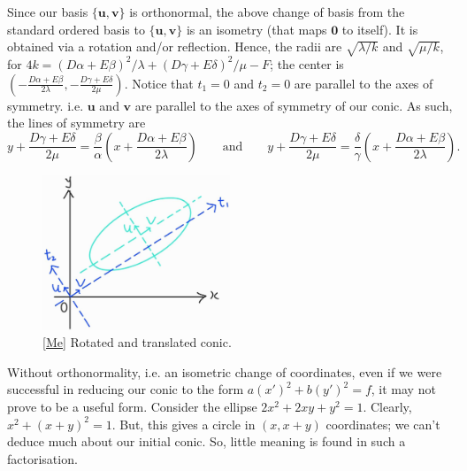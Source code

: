Since our basis \(\{\mathbf{u},\mathbf{v}\}\) is orthonormal, the above change of basis from the standard ordered basis to \(\{\mathbf{u},\mathbf{v}\}\) is an isometry (that maps \(\mathbf{0}\) to itself). It is obtained via a rotation and/or reflection. Hence, the radii are \(\sqrt{\lambda/k}\) and \(\sqrt{\mu/k}\), for \(4k=(D\alpha+E\beta)^2/\lambda+(D\gamma+E\delta)^2/\mu-F\); the center is \(\left(-\frac{D\alpha+E\beta}{2\lambda},-\frac{D\gamma+E\delta}{2\mu} \right)\). Notice that \(t_1=0\) and \(t_2=0\) are parallel to the axes of symmetry. i.e. \(\mathbf{u}\) and \(\mathbf{v}\) are parallel to the axes of symmetry of our conic. As such, the lines of symmetry are 
\[y+\frac{D\gamma+E\delta}{2\mu}=\frac{\beta}{\alpha}\left( x+\frac{D\alpha+E\beta}{2\lambda} \right) \qquad\text{and}\qquad y+\frac{D\gamma+E\delta}{2\mu}=\frac{\delta}{\gamma}\left( x+\frac{D\alpha+E\beta}{2\lambda} \right).\]
\begin{figure}[htbp]
    \centering
    \includegraphics[width=0.5\textwidth]{../Diagrams/rotated-conics.jpg}
    \caption{\ref{Me} Rotated and translated conic.}
    \label{fig:rotated-conic}
\end{figure}
\begin{note}
    Without orthonormality, i.e. an isometric change of coordinates, even if we were successful in reducing our conic to the form \(a(x')^2+b(y')^2=f\), it may not prove to be a useful form. Consider the ellipse \(2x^2+2xy+y^2=1\). Clearly, \(x^2+(x+y)^2=1\). But, this gives a circle in \((x,x+y)\) coordinates; we can't deduce much about our initial conic. So, little meaning is found in such a factorisation. 
\end{note}
